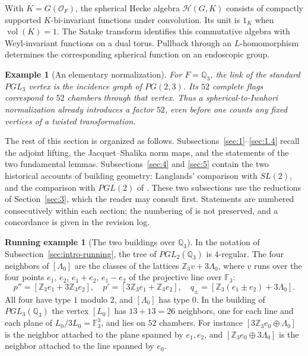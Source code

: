 \documentclass[12pt,letterpaper]{amsart}
\numberwithin{equation}{section}
\newtheorem{example}[theorem]{Example}
\theoremstyle{definition}
\newtheorem{runex}[theorem]{Running example}
\theoremstyle{plain}
\begin{document}
With $K=G(\mathcal O_F)$, the spherical Hecke algebra
$\mathcal H(G,K)$ consists of compactly supported $K$-bi-invariant
functions under convolution. Its unit is $1_K$ when
$\operatorname{vol}(K)=1$. The Satake transform identifies this
commutative algebra with Weyl-invariant functions on a dual torus.
Pullback through an $L$-homomorphism determines the corresponding
spherical function on an endoscopic group.

\begin{example}[An elementary normalization]
For $F=\mathbb Q_3$, the link of the standard $PGL_3$ vertex is the
incidence graph of $PG(2,3)$. Its $52$ complete flags correspond to
$52$ chambers through that vertex. Thus a spherical-to-Iwahori
normalization already introduces a factor $52$, even before one
counts any fixed vertices of a twisted transformation.
\end{example}



The rest of this section is organized as follows.
Subsections~\ref{sec:1}--\ref{sec:1.4} recall the adjoint lifting, the
Jacquet--Shalika norm maps, and the statements of the two fundamental
lemmas. Subsections~\ref{sec:4} and \ref{sec:5} contain the two
historical accounts of building geometry: Langlands' comparison with
$SL(2)$, and the comparison with $PGL(2)$ of \cite{Jo90}. These two
subsections use the reductions of Section~\ref{sec:3}, which the
reader may consult first. Statements are numbered consecutively within
each section; the numbering of \cite{Jo90} is not preserved, and a
concordance is given in the revision log.

\begin{runex}[The two buildings over $\mathbb Q_3$]
\label{run:background}
In the notation of Subsection~\ref{sec:intro-running}, the tree of
$PGL_2(\mathbb Q_3)$ is $4$-regular. The four neighbors of
$[\Lambda_0]$ are the classes of the lattices
$\mathbb Z_3v+3\Lambda_0$, where $v$ runs over the four points
$e_1$, $e_2$, $e_1+e_2$, $e_1-e_2$ of the projective line over
$\mathbb F_3$:
\[
 p''=[\mathbb Z_3e_1+3\mathbb Z_3e_2],\quad
 p'=[3\mathbb Z_3e_1+\mathbb Z_3e_2],\quad
 q_\pm=[\mathbb Z_3(e_1\pm e_2)+3\Lambda_0].
\]
All four have type $1$ modulo $2$, and $[\Lambda_0]$ has type $0$.
In the building of $PGL_3(\mathbb Q_3)$ the vertex $[L_0]$ has
$13+13=26$ neighbors, one for each line and each plane of
$L_0/3L_0=\mathbb F_3^3$, and lies on $52$ chambers. For instance
$[3\mathbb Z_3e_0\oplus\Lambda_0]$ is the neighbor attached to the
plane spanned by $e_1,e_2$, and
$[\mathbb Z_3e_0\oplus3\Lambda_0]$ is the neighbor attached to the
line spanned by $e_0$.
\end{runex}
\end{document}
